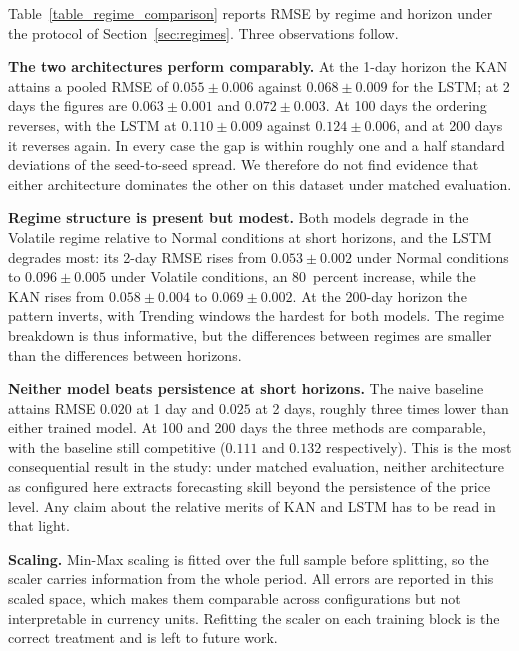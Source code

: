 Table~\ref{table_regime_comparison} reports RMSE by regime and horizon under the
protocol of Section~\ref{sec:regimes}. Three observations follow.

\noindent\textbf{The two architectures perform comparably.}
At the 1-day horizon the KAN attains a pooled RMSE of $0.055 \pm 0.006$ against
$0.068 \pm 0.009$ for the LSTM; at 2 days the figures are $0.063 \pm 0.001$ and
$0.072 \pm 0.003$. At 100 days the ordering reverses, with the LSTM at
$0.110 \pm 0.009$ against $0.124 \pm 0.006$, and at 200 days it reverses again.
In every case the gap is within roughly one and a half standard deviations of
the seed-to-seed spread. We therefore do not find evidence that either
architecture dominates the other on this dataset under matched evaluation.

\noindent\textbf{Regime structure is present but modest.}
Both models degrade in the Volatile regime relative to Normal conditions at
short horizons, and the LSTM degrades most: its 2-day RMSE rises from
$0.053 \pm 0.002$ under Normal conditions to $0.096 \pm 0.005$ under Volatile
conditions, an 80~percent increase, while the KAN rises from
$0.058 \pm 0.004$ to $0.069 \pm 0.002$. At the 200-day horizon the pattern
inverts, with Trending windows the hardest for both models. The regime
breakdown is thus informative, but the differences between regimes are smaller
than the differences between horizons.

\noindent\textbf{Neither model beats persistence at short horizons.}
The naive baseline attains RMSE $0.020$ at 1 day and $0.025$ at 2 days,
roughly three times lower than either trained model. At 100 and 200 days the
three methods are comparable, with the baseline still competitive
($0.111$ and $0.132$ respectively). This is the most consequential result in
the study: under matched evaluation, neither architecture as configured here
extracts forecasting skill beyond the persistence of the price level. Any claim
about the relative merits of KAN and LSTM has to be read in that light.


\noindent\textbf{Scaling.} Min-Max scaling is fitted over the full sample
before splitting, so the scaler carries information from the whole period. All
errors are reported in this scaled space, which makes them comparable across
configurations but not interpretable in currency units. Refitting the scaler on
each training block is the correct treatment and is left to future work.

